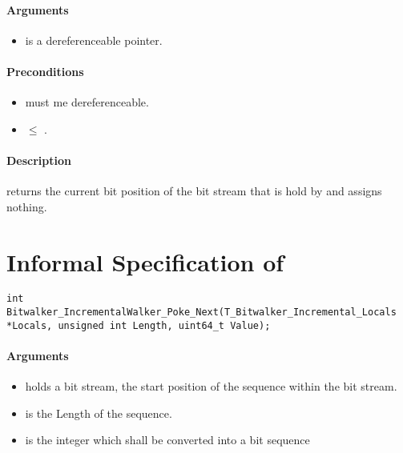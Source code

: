 \paragraph{Arguments}

\begin{itemize}
   \item  {} is a dereferenceable pointer.
\end{itemize}

\paragraph{Preconditions}
\begin{itemize}
   \item  {} must me dereferenceable.
   \item {} $\leq $ .
\end{itemize}

\paragraph{Description}

\peekfinish  returns the current bit position of the bit stream that is hold by  and assigns nothing.


\clearpage

\section{Informal Specification of }
\begin{lstlisting}[style=acsl-block]
int		 Bitwalker_IncrementalWalker_Poke_Next(T_Bitwalker_Incremental_Locals *Locals, unsigned int Length, uint64_t Value);
\end{lstlisting}

\paragraph{Arguments}

\begin{itemize}
    \item  {} holds a bit stream, the start position of the sequence within the bit stream.
   \item {} is the Length of the sequence.
   \item {} is the integer which shall be converted into a bit sequence
\end{itemize}

